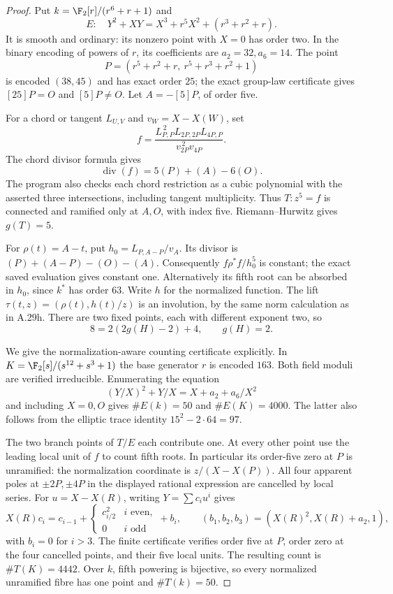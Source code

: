 \begin{proof}
Put $k=\F_2[r]/(r^6+r+1)$ and
\[
 E:\quad Y^2+XY=X^3+r^5X^2+(r^3+r^2+r).
\]
It is smooth and ordinary: its nonzero point with $X=0$
has order two. In the binary encoding of powers of $r$,
its coefficients are $a_2=32,a_6=14$. The point
\[
 P=(r^5+r^2+r,\ r^5+r^3+r^2+1)
\]
is encoded $(38,45)$ and has exact order $25$;
the exact group-law certificate gives $[25]P=O$ and
$[5]P\ne O$. Let $A=-[5]P$, of order five.

For a chord or tangent $L_{U,V}$ and
$v_W=X-X(W)$, set
\[
 f=\frac{L_{P,P}^{\,2}L_{2P,2P}L_{4P,P}}
          {v_{2P}^{\,2}v_{4P}}.
\]
The chord divisor formula gives
\[
 \operatorname{div}(f)=5(P)+(A)-6(O).                    \tag{A.47}
\]
The program also checks each chord restriction as a
cubic polynomial with the asserted three intersections,
including tangent multiplicity. Thus $T:z^5=f$ is
connected and ramified only at $A,O$, with index five.
Riemann--Hurwitz gives $g(T)=5$.

For $\rho(t)=A-t$, put $h_0=L_{P,A-P}/v_A$.
Its divisor is $(P)+(A-P)-(O)-(A)$. Consequently
$f\rho^*f/h_0^5$ is constant; the exact saved evaluation
gives constant one. Alternatively its fifth root can
be absorbed in $h_0$, since $k^*$ has order $63$.
Write $h$ for the normalized function. The lift
$\tau(t,z)=(\rho(t),h(t)/z)$ is an involution, by the
same norm calculation as in A.29h. There are two
fixed points, each with different exponent two, so
\[
 8=2(2g(H)-2)+4,\qquad g(H)=2.
\]

We give the normalization-aware counting certificate
explicitly. In
$K=\F_2[s]/(s^{12}+s^3+1)$ the base generator $r$ is
encoded $163$. Both field moduli are verified
irreducible. Enumerating the equation
\[
 (Y/X)^2+Y/X=X+a_2+a_6/X^2
\]
and including $X=0,O$ gives $\#E(k)=50$ and
$\#E(K)=4000$. The latter also follows from the
elliptic trace identity $15^2-2\cdot64=97$.

The two branch points of $T/E$ each contribute one.
At every other point use the leading local unit of
$f$ to count fifth roots. In particular its order-five
zero at $P$ is unramified: the normalization coordinate
is $z/(X-X(P))$. All four apparent poles at
$\pm2P,\pm4P$ in the displayed rational expression
are cancelled by local series. For
$u=X-X(R)$, writing $Y=\sum c_i u^i$ gives
\[
 X(R)c_i=c_{i-1}+
 \begin{cases}c_{i/2}^2&i\text{ even},\\0&i\text{ odd}\end{cases}
 +b_i,\qquad
 (b_1,b_2,b_3)=(X(R)^2,X(R)+a_2,1),
\]
with $b_i=0$ for $i>3$.
The finite certificate verifies order five at $P$,
order zero at the four cancelled points, and their
five local units. The resulting count is
$\#T(K)=4442$. Over $k$, fifth powering is bijective,
so every normalized unramified fibre has one point
and $\#T(k)=50$.


\end{proof}
